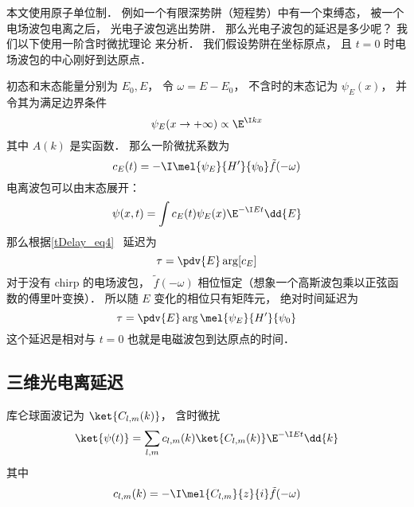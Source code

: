 
\begin{issues}
\issueDraft
\end{issues}


本文使用原子单位制． 例如一个有限深势阱（短程势）中有一个束缚态， 被一个电场波包电离之后， 光电子波包逃出势阱． 那么光电子波包的延迟是多少呢？ 我们以下使用一阶含时微扰理论 来分析． 我们假设势阱在坐标原点， 且 $t = 0$ 时电场波包的中心刚好到达原点．

初态和末态能量分别为 $E_0, E$， 令 $\omega = E - E_0$， 不含时的末态记为 $\psi_E(x)$， 并令其为满足边界条件
\begin{equation}\label{HeAna2_eq2}
\psi_E(x \to +\infty) \propto \E^{\I kx}
\end{equation}
其中 $A(k)$ 是实函数． 那么一阶微扰系数为
\begin{equation}
c_E(t) = -\I  \mel{\psi_E}{H'}{\psi_0} \tilde f(-\omega)
\end{equation}
电离波包可以由末态展开：
\begin{equation}
\psi(x, t) = \int c_E(t) \psi_E(x)\E^{-\I E t} \dd{E}
\end{equation}
那么根据\autoref{tDelay_eq4}~ 延迟为
\begin{equation}
\tau = \pdv{E} \arg [c_E]
\end{equation}
对于没有 chirp 的电场波包， $\tilde f(-\omega)$ 相位恒定（想象一个高斯波包乘以正弦函数的傅里叶变换）． 所以随 $E$ 变化的相位只有矩阵元， 绝对时间延迟为
\begin{equation}\label{HeAna2_eq1}
\tau = \pdv{E} \arg \mel{\psi_E}{H'}{\psi_0}
\end{equation}
这个延迟是相对与 $t = 0$ 也就是电磁波包到达原点的时间．

\subsection{三维光电离延迟}
库仑球面波记为 $\ket{C_{l,m}(k)}$， 含时微扰
\begin{equation}
\ket{\psi(t)} = \sum_{l,m} c_{l,m}(k) \ket{C_{l,m}(k)} \E^{-\I E t} \dd{k}
\end{equation}
其中
\begin{equation}
c_{l,m}(k) = -\I \mel{C_{l,m}}{z}{i} \tilde f(-\omega)
\end{equation}


